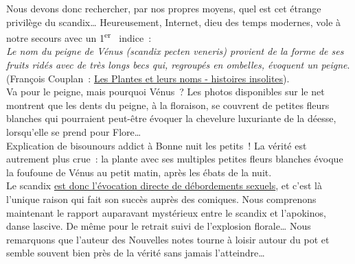 \documentclass{book}%
\newcommand{\italique}[1]{\textit{#1}}%
\newcommand{\expo}[1]{\textsuperscript{#1}}%
\begin{document}
Nous devons donc rechercher, par nos propres moyens, quel est cet étrange privilège du scandix… Heureusement, Internet, dieu des temps modernes, vole à notre secours avec un 1\expo{er}  indice :\\
\italique{Le nom du peigne de Vénus (scandix pecten veneris) provient de la forme de ses fruits ridés avec de très longs becs qui, regroupés en ombelles, évoquent un peigne}.\\
(François Couplan : \underline{Les Plantes et leurs noms - histoires insolites}).\\
Va pour le peigne, mais pourquoi Vénus ? Les photos disponibles sur le net montrent que les dents du peigne, à la floraison, se couvrent de petites fleurs blanches qui pourraient peut-être évoquer la chevelure luxuriante de la déesse, lorsqu’elle se prend pour Flore…\\
Explication de bisounours addict à Bonne nuit les petits ! La vérité est autrement plus crue : la plante avec ses multiples petites fleurs blanches évoque la foufoune de Vénus au petit matin, après les ébats de la nuit.\\
Le scandix \underline{est donc l’évocation directe de débordements sexuels}, et c’est là l’unique raison qui fait son succès auprès des comiques. 
Nous comprenons maintenant le rapport auparavant mystérieux entre le scandix et l’apokinos, danse lascive. De même pour le retrait suivi de l’explosion florale… Nous remarquons que l’auteur des Nouvelles notes tourne à loisir autour du pot et semble souvent bien près de la vérité sans jamais l’atteindre… 
\end{document}
